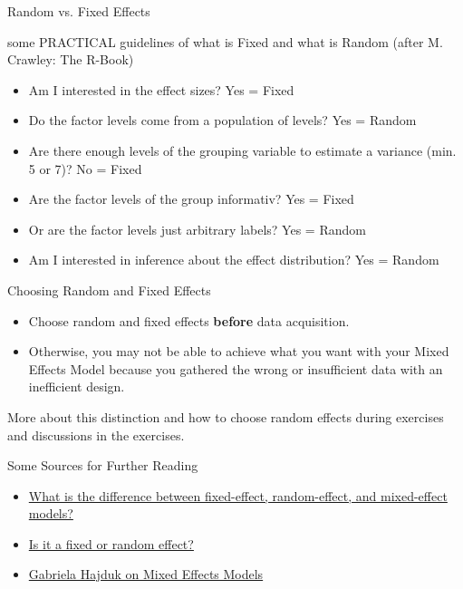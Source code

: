 \documentclass{beamer}
\begin{document}
\begin{frame}{Random vs. Fixed Effects}

some PRACTICAL guidelines of what is Fixed and what is Random (after M. Crawley: The R-Book)

  \begin{itemize}
    \item Am I interested in the effect sizes? Yes = Fixed
    \item Do the factor levels come from a population of levels? Yes = Random
    \item Are there enough levels of the grouping variable to estimate a variance (min. 5 or 7)? No = Fixed
    \item Are the factor levels of the group informativ? Yes = Fixed 
    \item Or are the factor levels just arbitrary labels? Yes = Random
    \item Am I interested in inference about the effect distribution? Yes = Random 
    
  \end{itemize}
\end{frame}


\begin{frame}{Choosing Random and Fixed Effects}
  \begin{itemize}
    \item Choose random and fixed effects \textbf{before} data acquisition.
    \item Otherwise, you may not be able to achieve what you want with your Mixed Effects Model because you gathered the wrong or insufficient data with an inefficient design.
  \end{itemize}

  More about this distinction and how to choose random effects during exercises and discussions in the exercises.
  
\end{frame}

\begin{frame}{Some Sources for Further Reading}
  \begin{itemize}
    \item \href{https://stats.stackexchange.com/questions/4700/what-is-the-difference-between-fixed-effect-random-effect-and-mixed-effect-mode/4702\#4702}{What is the difference between fixed-effect, random-effect, and mixed-effect models?}
    \item \href{https://dynamicecology.wordpress.com/2015/11/04/is-it-a-fixed-or-random-effect/}{Is it a fixed or random effect?}
    \item \href{https://gkhajduk.github.io/2017-03-09-mixed-models/}{Gabriela Hajduk on Mixed Effects Models}
  \end{itemize}
\end{frame}
\end{document}
